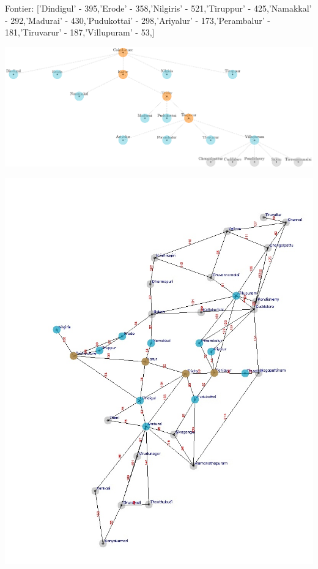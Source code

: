 \documentclass[xcolor=table]{beamer}
\begin{document}
\begin{frame}
  { \tiny Fontier: ['Dindigul' - 395,'Erode' - 358,'Nilgiris' - 521,'Tiruppur' - 425,'Namakkal' - 292,'Madurai' - 430,'Pudukottai' - 298,'Ariyalur' - 173,'Perambalur' - 181,'Tiruvarur' - 187,'Villupuram' - 53,]}
  \begin{center}
  \includegraphics[height=0.35\textheight]{../GreedyNode/6-1.png}
  \end{center}
  \begin{center}
    \includegraphics[height=0.55\textheight]{../Greedyoutput/tamilGreedy4.jpg}
  \end{center}
\end{frame}
\end{document}
